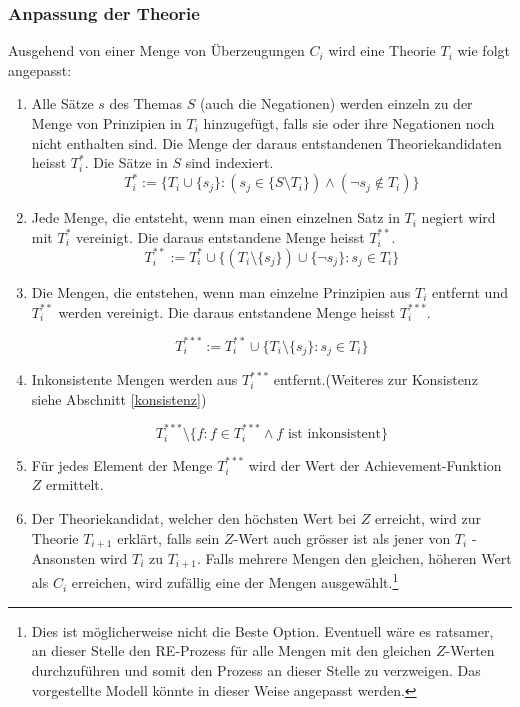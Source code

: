 \documentclass{article}
\begin{document}
\subsubsection{Anpassung der Theorie} \label{T-Anpassung}
Ausgehend von einer Menge von Überzeugungen $C_i$ wird eine Theorie $T_i$ wie folgt angepasst: 
\begin{enumerate}
    \item \label{1} Alle Sätze $s$ des Themas $S$ (auch die Negationen) werden einzeln zu der Menge von Prinzipien in $T_i$ hinzugefügt, falls sie oder ihre Negationen noch nicht enthalten sind. Die Menge der daraus entstandenen Theoriekandidaten heisst $T_i^*$. Die Sätze in $S$ sind indexiert.
    $$ 
        T_i^*:= \{ T_i \cup \{s_j\}: (s_j \in \{S \setminus T_i\}) \land (\neg s_j \not\in T_i) \}
    $$
    \item \label{1.1} Jede Menge, die entsteht, wenn man einen einzelnen Satz in $T_i$ negiert wird mit $T_i^*$ vereinigt. Die daraus entstandene Menge heisst $T_i^{**}$.
    $$
        T_i^{**}:= T_i^* \cup \{ (T_i \setminus \{s_j\}) \cup \{\neg s_j\}: s_j \in T_i\}
    $$
    \item \label{2} Die Mengen, die entstehen, wenn man einzelne Prinzipien aus $T_i$ entfernt und $T_i^{**}$ werden vereinigt. Die daraus entstandene Menge heisst $T_i^{***}$.
    
    $$
        T_i^{***}:= T_i^{**} \cup \{ T_i \setminus \{s_j\}: s_j \in T_i\}
    $$
    
    \item \label{konsistenzfilter} Inkonsistente Mengen werden aus $T_i^{***}$ entfernt.(Weiteres zur Konsistenz siehe Abschnitt \ref{konsistenz})
    
    $$
        T_i^{***} \setminus \{f : f \in T_i^{***} \land f \text{ ist inkonsistent} \}
    $$
    \item \label{3} Für jedes Element der Menge $T_i^{***}$ wird der Wert der Achievement-Funktion $Z$ ermittelt.
    \item \label{4} Der Theoriekandidat, welcher den höchsten Wert bei $Z$ erreicht, wird zur Theorie $T_{i+1}$ erklärt, falls sein $Z$-Wert auch grösser ist als jener von $T_i$ - Ansonsten wird $T_i$ zu $T_{i+1}$. Falls mehrere Mengen den gleichen, höheren Wert als $C_i$ erreichen, wird zufällig eine der Mengen ausgewählt.\footnote{Dies ist möglicherweise nicht die Beste Option. Eventuell wäre es ratsamer, an dieser Stelle den RE-Prozess für alle Mengen mit den gleichen $Z$-Werten durchzuführen und somit den Prozess an dieser Stelle zu verzweigen. Das vorgestellte Modell könnte in dieser Weise angepasst werden.}
\end{enumerate}
\end{document}
